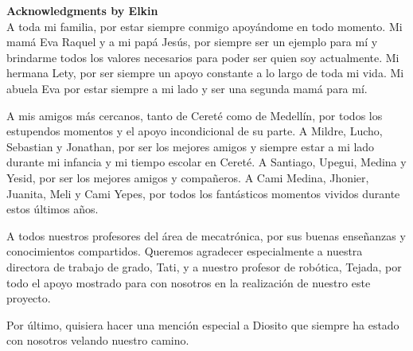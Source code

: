 \documentclass[11pt]{report} %
\begin{document}
\begin{titlepage}
\begin{center}
\begin{Large}
\end{Large}

\begin{Large}

\vspace*{3cm}

\textbf{Acknowledgments by Elkin}\\
\vspace*{0.2cm}
A toda mi familia, por estar siempre conmigo apoyándome en todo momento. Mi mamá Eva Raquel y a mi papá Jesús, por siempre ser un ejemplo para mí y brindarme  todos los valores necesarios para poder ser quien soy actualmente. Mi hermana Lety, por ser siempre un apoyo constante a lo largo de toda mi vida. Mi abuela Eva por estar siempre a mi lado y ser una segunda mamá para mí.

\vspace*{0.4cm}

A mis amigos más cercanos, tanto de Cereté como de Medellín, por todos los estupendos momentos y el apoyo incondicional de su parte. A Mildre, Lucho, Sebastian y Jonathan, por ser los mejores amigos y siempre estar a mi lado durante mi infancia y mi tiempo escolar en Cereté. A Santiago, Upegui, Medina y Yesid, por ser los mejores amigos y compañeros. A Cami Medina, Jhonier, Juanita, Meli y Cami Yepes, por todos los fantásticos momentos vividos durante estos últimos años. 

\vspace*{0.4cm}

A todos nuestros profesores del área de mecatrónica, por sus buenas enseñanzas y conocimientos compartidos. Queremos agradecer especialmente a nuestra directora de trabajo de grado, Tati, y a nuestro profesor de robótica, Tejada, por todo el apoyo mostrado para con nosotros en la realización de nuestro este proyecto.

\vspace*{0.4cm}

Por último, quisiera hacer una mención especial a Diosito que siempre ha estado con nosotros velando nuestro camino.

\end{Large}

\vfill

\end{center}
\end{titlepage}


\end{document}
